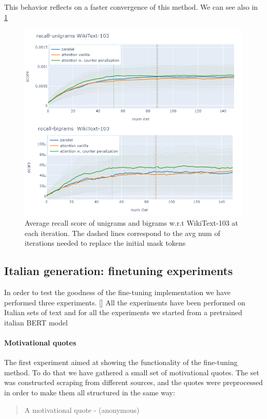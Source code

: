 \documentclass[10pt,twocolumn,letterpaper]{article}
\begin{document}
This behavior reflects on a faster convergence of this method. We can see also in \ref{fig:Recall}

\begin{figure}[t!]
   \centering
   \includegraphics[scale=0.4]{recall.png}
   \caption{Average recall score of unigrams and bigrams w.r.t WikiText-103
   at each iteration. The dashed lines correspond to the avg num of iterations needed
   to replace the initial mask tokens}
   \label{fig:Recall}
\end{figure}

\subsection{Italian generation: finetuning experiments}
In order to test the goodness of the fine-tuning implementation we have performed three experiments. []
All the experiments have been performed on Italian sets of text and for all the experiments we started from a
pretrained italian BERT model

\paragraph{Motivational quotes} The first experiment aimed at showing the functionality of the fine-tuning method.
To do that we have gathered a small set of motivational quotes.
The set was constructed scraping from different sources, and the quotes were preprocessed in order to make them
all structured in the same way:
\begin{quote}
   A motivational quote - (anonymous)
\end{quote}
\end{document}
